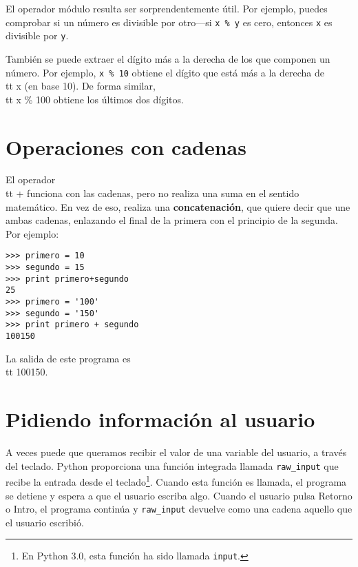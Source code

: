 El operador módulo resulta ser sorprendentemente útil. Por ejemplo,
puedes comprobar si un número es divisible por otro---si
{\tt x \% y} es cero, entonces {\tt x} es divisible por {\tt y}.


También se puede extraer el dígito más a la derecha
de los que componen un número. Por ejemplo, {\tt x \% 10} obtiene el
dígito que está más a la derecha de {\\tt x} (en base 10). De forma similar, {\\tt x \% 100}
obtiene los últimos dos dígitos.

\section{Operaciones con cadenas}

El operador {\\tt +} funciona con las cadenas, pero
no realiza una suma en el sentido matemático. En vez de eso, realiza una
{\bf concatenación}, que quiere decir que une ambas cadenas,
enlazando el final de la primera con el principio de la segunda. Por ejemplo:


\beforeverb
\begin{verbatim}
>>> primero = 10
>>> segundo = 15
>>> print primero+segundo
25
>>> primero = '100'
>>> segundo = '150'
>>> print primero + segundo
100150
\end{verbatim}
\afterverb
%
La salida de este programa es {\\tt 100150}.

\section{Pidiendo información al usuario}

A veces puede que queramos recibir el valor de una variable del usuario,
a través del teclado.
Python proporciona una función integrada llamada \verb"raw_input" que recibe
la entrada desde el teclado\footnote{En Python 3.0, esta función ha sido llamada
	{\tt input}.}. Cuando esta función es llamada, el programa se detiene y
espera a que el usuario escriba algo. Cuando el usuario pulsa {\sf Retorno} o
{\sf Intro}, el programa continúa y \verb"raw_input"
devuelve como una cadena aquello que el usuario escribió.


